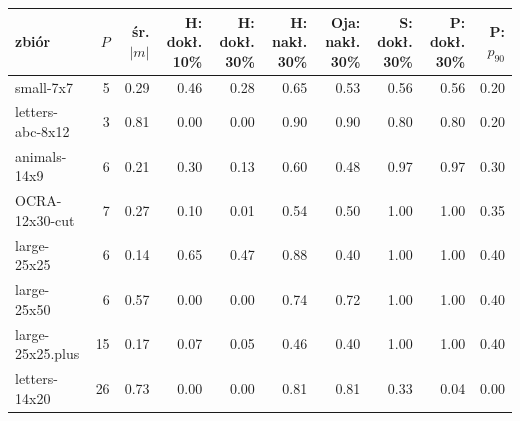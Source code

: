 \begin{tabular}{lrrrrrrrrr}

\toprule

zbiór & $P$ & śr. $|m|$ & H: dokł. 10\% & H: dokł. 30\% & H: nakł. 30\% & Oja: nakł. 30\% & S: dokł. 30\% & P: dokł. 30\% & P: $p_{90}$ \\

\midrule

small-7x7 & 5 & 0.29 & 0.46 & 0.28 & 0.65 & 0.53 & 0.56 & 0.56 & 0.20 \\

letters-abc-8x12 & 3 & 0.81 & 0.00 & 0.00 & 0.90 & 0.90 & 0.80 & 0.80 & 0.20 \\

animals-14x9 & 6 & 0.21 & 0.30 & 0.13 & 0.60 & 0.48 & 0.97 & 0.97 & 0.30 \\

OCRA-12x30-cut & 7 & 0.27 & 0.10 & 0.01 & 0.54 & 0.50 & 1.00 & 1.00 & 0.35 \\

large-25x25 & 6 & 0.14 & 0.65 & 0.47 & 0.88 & 0.40 & 1.00 & 1.00 & 0.40 \\

large-25x50 & 6 & 0.57 & 0.00 & 0.00 & 0.74 & 0.72 & 1.00 & 1.00 & 0.40 \\

large-25x25.plus & 15 & 0.17 & 0.07 & 0.05 & 0.46 & 0.40 & 1.00 & 1.00 & 0.40 \\

letters-14x20 & 26 & 0.73 & 0.00 & 0.00 & 0.81 & 0.81 & 0.33 & 0.04 & 0.00 \\

\bottomrule

\end{tabular}

